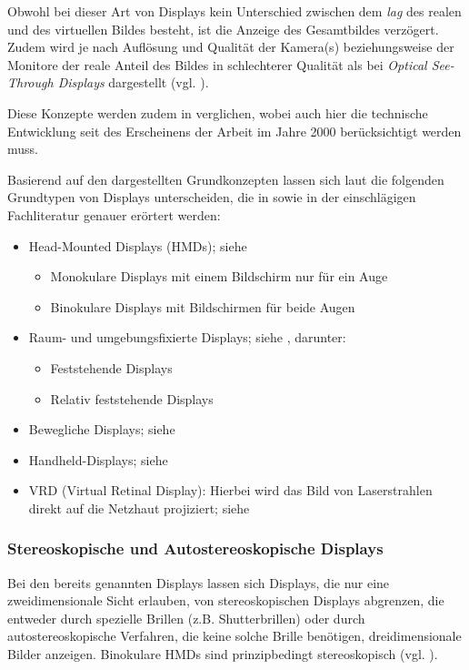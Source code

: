 \documentclass[pdftex,a4paper,titlepage,12pt]{scrartcl}
\newtheorem[L]{boxedDefinition}{Definition}
\begin{document}
\begin{itemize}
 Obwohl bei dieser Art von Displays kein Unterschied zwischen dem \textit{lag} des realen und des virtuellen Bildes besteht, ist die Anzeige des Gesamtbildes verzögert. Zudem wird je nach Auflösung und Qualität der Kamera(s) beziehungsweise der Monitore der reale Anteil des Bildes in schlechterer Qualität als bei \textit{Optical See-Through Displays} dargestellt (vgl. \cite[Kapitel 2.2, Seite 22]{Toe2010}). 
\end{itemize}
Diese Konzepte werden zudem in \cite{Rolland2000} verglichen, wobei auch hier die technische Entwicklung seit des Erscheinens der Arbeit im Jahre 2000 berücksichtigt werden muss.

Basierend auf den dargestellten Grundkonzepten lassen sich laut \cite[Kapitel 2.2, Seite 22-30]{Toe2010} die folgenden Grundtypen von Displays unterscheiden, die in \cite{Toe2010} sowie in der einschlägigen Fachliteratur genauer erörtert werden:
 \begin{itemize}
 \item Head-Mounted Displays (HMDs); siehe \cite[Kapitel 2.2.1, Seite 23-25]{Toe2010}
 \begin{itemize}
  \item Monokulare Displays mit einem Bildschirm nur für ein Auge
  \item Binokulare Displays mit Bildschirmen für beide Augen
 \end{itemize}
 \item Raum- und umgebungsfixierte Displays; siehe \cite[Kapitel 2.2.2, Seite 25-28]{Toe2010}, darunter:
 \begin{itemize}
    \item Feststehende Displays
    \item Relativ feststehende Displays
 \end{itemize}
 \item Bewegliche Displays; siehe \cite[Kapitel 2.2.3, Seite 28]{Toe2010}
 \item Handheld-Displays; siehe \cite[Kapitel 2.2.4, Seite 28f.]{Toe2010}
 \item VRD (Virtual Retinal Display): Hierbei wird das Bild von Laserstrahlen direkt auf die Netzhaut projiziert; siehe \cite[Kapitel 3.1.2, Seite 5f.]{Suthau2002DE}
\end{itemize}

\subsubsection{Stereoskopische und Autostereoskopische Displays}
Bei den bereits genannten Displays lassen sich Displays, die nur eine zweidimensionale Sicht erlauben, von stereoskopischen Displays abgrenzen, die entweder durch spezielle Brillen (z.B. Shutterbrillen) oder durch autostereoskopische Verfahren, die keine solche Brille benötigen, dreidimensionale Bilder anzeigen. Binokulare HMDs sind prinzipbedingt stereoskopisch (vgl. \cite[Kapitel 2.2.1, Seite 23-25]{Toe2010}).
\end{document}
